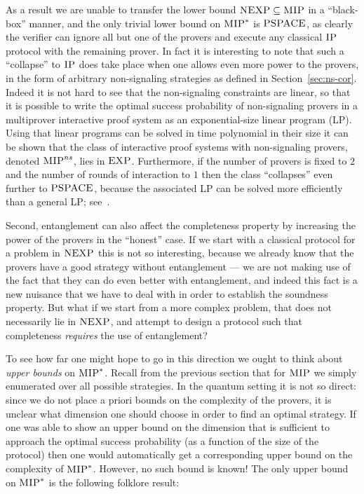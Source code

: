 As a result we are unable to transfer the lower bound $\textsc{NEXP} \subseteq \textsc{MIP}$ in a ``black-box'' manner, and the only trivial lower bound on $\textsc{MIP}^*$ is $\textsc{PSPACE}$, as clearly the verifier can ignore all but one of the provers and execute any classical $\textsc{IP}$ protocol with the remaining prover. In fact it is interesting to note that such a ``collapse'' to $\textsc{IP}$ does take place when one allows even more power to the provers, in the form of arbitrary non-signaling strategies as defined in Section~\ref{sec:ns-cor}. Indeed it is not hard to see that the non-signaling constraints are linear, so that it is possible to write the optimal success probability of non-signaling provers in a multiprover interactive proof system as an exponential-size linear program (LP). Using that linear programs can be solved in time polynomial in their size it can be shown that the class of interactive proof systems with non-signaling provers, denoted $\textsc{MIP}^{ns}$, lies in $\textsc{EXP}$. Furthermore, if the number of provers is fixed to $2$ and the number of rounds of interaction to $1$ then the class ``collapses'' even further to $\textsc{PSPACE}$, because the associated LP can be solved more efficiently than a general LP; see~\cite{ito2010polynomial}. 

Second, entanglement can also affect the completeness property by increasing the power of the provers in the ``honest'' case. If we start with a classical protocol for a problem in $\textsc{NEXP}$ this is not so interesting, because we already know that the provers have a good strategy without entanglement --- we are not making use of the fact that they can do even better with entanglement, and indeed this fact is a new nuisance that we have to deal with in order to establish the soundness property. But what if we start from a more complex problem, that does not necessarily lie in $\textsc{NEXP}$, and attempt to design a protocol such that completeness 
\emph{requires} the use of entanglement? 

To see how far one might hope to go in this direction we ought to think about \emph{upper bounds} on $\textsc{MIP}^*$. Recall from the previous section that for $\textsc{MIP}$ we simply enumerated over all possible strategies. In the quantum setting it is not so direct: since we do not place a priori bounds on the complexity of the provers, it is unclear what dimension one should choose in order to find an optimal strategy. If one was able to show an upper bound on the dimension that is sufficient to approach the optimal success probability (as a function of the size of the protocol) then one would automatically get a corresponding upper bound on the complexity of $\textsc{MIP}^*$. However, no such bound is known! The only upper bound on $\textsc{MIP}^*$ is the following folklore result: 


